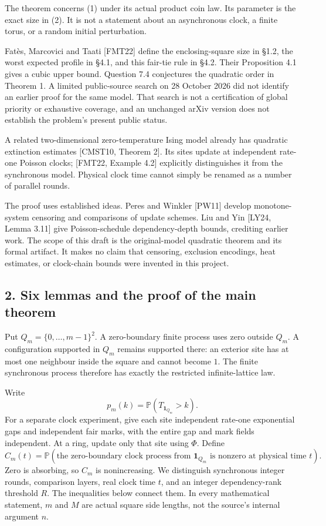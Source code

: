 \documentclass[
  11pt,
  a4paper,
]{article}
\begin{document}
The theorem concerns (1) under its actual product coin law. Its
parameter is the exact size in (2). It is not a statement about an
asynchronous clock, a finite torus, or a random initial perturbation.

Fatès, Marcovici and Taati {[}FMT22{]} define the enclosing-square size
in §1.2, the worst expected profile in §4.1, and this fair-tie rule in
§4.2. Their Proposition 4.1 gives a cubic upper bound. Question 7.4
conjectures the quadratic order in Theorem 1. A limited public-source
search on 28 October 2026 did not identify an earlier proof for the same
model. That search is not a certification of global priority or
exhaustive coverage, and an unchanged arXiv version does not establish
the problem's present public status.

A related two-dimensional zero-temperature Ising model already has
quadratic extinction estimates {[}CMST10, Theorem 2{]}. Its sites update
at independent rate-one Poisson clocks; {[}FMT22, Example 4.2{]}
explicitly distinguishes it from the synchronous model. Physical clock
time cannot simply be renamed as a number of parallel rounds.

The proof uses established ideas. Peres and Winkler {[}PW11{]} develop
monotone-system censoring and comparisons of update schemes. Liu and Yin
{[}LY24, Lemma 3.11{]} give Poisson-schedule dependency-depth bounds,
crediting earlier work. The scope of this draft is the original-model
quadratic theorem and its formal artifact. It makes no claim that
censoring, exclusion encodings, heat estimates, or clock-chain bounds
were invented in this project.

\subsection{2. Six lemmas and the proof of the main
theorem}\label{six-lemmas-and-the-proof-of-the-main-theorem}

Put \(Q_m=\{0,\ldots,m-1\}^2\). A zero-boundary finite process uses zero
outside \(Q_m\). A configuration supported in \(Q_m\) remains supported
there: an exterior site has at most one neighbour inside the square and
cannot become \(1\). The finite synchronous process therefore has
exactly the restricted infinite-lattice law.

Write \[
p_m(k)=\mathbb P(T_{\mathbf1_{Q_m}}>k).
\] For a separate clock experiment, give each site independent rate-one
exponential gaps and independent fair marks, with the entire gap and
mark fields independent. At a ring, update only that site using
\(\Phi\). Define \[
C_m(t)=\mathbb P(\text{the zero-boundary clock process from }
\mathbf1_{Q_m}\text{ is nonzero at physical time }t).
\tag{5}
\] Zero is absorbing, so \(C_m\) is nonincreasing. We distinguish
synchronous integer rounds, comparison layers, real clock time \(t\),
and an integer dependency-rank threshold \(R\). The inequalities below
connect them. In every mathematical statement, \(m\) and \(M\) are
actual square side lengths, not the source's internal argument \(n\).
\end{document}
